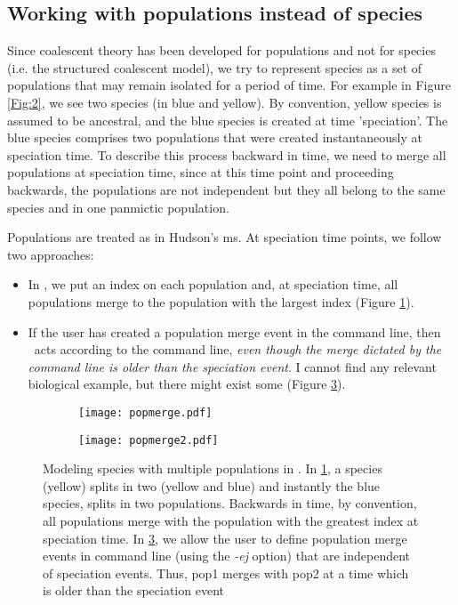 \subsection{ Working with populations instead of species }
Since coalescent theory has been developed for populations and not for species (i.e. the structured coalescent model), we try to represent species as a set of populations that may remain isolated for a period of time. For example in Figure \ref{Fig:2}, we see two species (in blue and yellow). By convention, yellow species is assumed to be ancestral, and the blue species is created at time 'speciation'. The blue species comprises two populations that were created instantaneously at speciation time. To describe this process backward in time, we need to merge all populations at speciation time, since at this time point and proceeding backwards, the populations are not independent but they all belong to the same species and in one panmictic population. 

Populations are treated as in Hudson's ms. At speciation time points, we follow two approaches:
\begin{itemize}
\item In \comus, we put an index on each population and, at speciation time, all populations merge to the population with the largest index (Figure \ref{fig:2}). 
\item If the user has created a population merge event in the command line, then \comus\ acts according to the command line, \emph{even though the merge dictated by the command line is older than the speciation event}. I cannot find any relevant biological example, but there might exist some (Figure \ref{fig:3}). 
\end{itemize}
  
\begin{figure}[htbp!]

  \begin{subfigure}{0.5\textwidth}
    \texttt{[image: popmerge.pdf]}
    \caption{}
    \label{fig:2}
  \end{subfigure}
  \begin{subfigure}{0.5\textwidth}
    \texttt{[image: popmerge2.pdf]}
    \caption{}
    \label{fig:3}
  \end{subfigure}
  \caption{Modeling species with multiple populations in \comus. In \ref{fig:2}, a species (yellow) splits in two (yellow and blue) and instantly the blue species, splits in two populations. Backwards in time, by convention, all populations merge with the population with the greatest index at speciation time. In \ref{fig:3}, we allow the user to define population merge events in command line (using the {\it -ej} option) that are independent of speciation events. Thus, pop1 merges with pop2 at a time which is older than the speciation event}
\end{figure}

